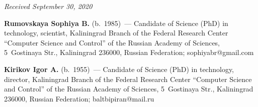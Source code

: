    \vspace*{-3pt}
   
   \hfill{\small\textit{Received September 30, 2020}}
   
   
   
   
   \Contr
   
   \noindent
   \textbf{Rumovskaya Sophiya B.} (b.\ 1985)~--- Candidate of Science (PhD) in technology, scientist, 
Kaliningrad Branch of the Federal Research Center ``Computer Science and Control'' of the Russian 
Academy of Sciences, 5~Gostinaya Str., Kaliningrad 236000, Russian Federation; 
\mbox{sophiyabr@gmail.com}
   
   \vspace*{3pt}
   
   \noindent
   \textbf{Kirikov Igor A.} (b.\ 1955)~--- Candidate of Science (PhD) in technology, director, Kaliningrad 
Branch of the Federal Research Center ``Computer Science and Control'' of the Russian Academy of 
Sciences, 5~Gostinaya Str., Kaliningrad 236000, Russian Federation; \mbox{baltbipiran@mail.ru}
   \label{end\stat}
   
   \renewcommand{\bibname}{\protect\rm Литература} 
         
